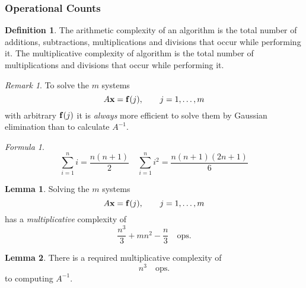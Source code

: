 \documentclass[11pt,letterpaper]{article}
\numberwithin{figure}{section} %
\newcommand{\inv}[1]{#1^{-1}}
\newcommand{\ops}{\quad\text{ops.}}
\newcommand{\keyword}[1]{\colorbox{cyan!20!}{#1}}
\theoremstyle{definition}
\theoremstyle{definition}
\newtheorem{lemma}{Lemma}[subsection]
\theoremstyle{definition}
\newtheorem{definition}{Definition}[subsection]
\theoremstyle{definition}
\theoremstyle{remark}
\newtheorem*{remark}{Remark}
\theoremstyle{remark}
\theoremstyle{definition}
\theoremstyle{remark}
\newtheorem*{formula}{Formula}
\theoremstyle{remark}
\begin{document}
\begin{multicols*}{3}
\subsubsection{Operational Counts}
\begin{definition}
The \keyword{arithmetic complexity} of an algorithm is the total number of
additions, subtractions, multiplications and divisions that occur while
performing it. The \keyword{multiplicative complexity} of algorithm is the
total number of multiplications and divisions that occur while performing it.
\end{definition}
\begin{remark}
To solve the $m$ systems
\[
	A\vb{x} = \vb{f}(j), \qquad j = 1,\ldots, m
\]
with arbitrary $\vb{f}(j)$ it is \emph{always} more efficient to solve them
by Gaussian elimination than to calculate $\inv{A}$.
\end{remark}
\begin{formula}
	\[
		\sum_{i=1}^n i = \frac{n(n+1)}{2} \quad \sum_{i=1}^n i^2 =
		\frac{n(n+1)(2n+1)}{6}
	\]
\end{formula}
\begin{lemma}
	Solving the $m$ systems
\[
	A\vb{x} = \vb{f}(j), \qquad j = 1,\ldots, m
\]
has a \emph{multiplicative} complexity of 
\[
	\frac{n^3}{3} + mn^2 - \frac{n}{3} \ops
\]
\end{lemma}
\begin{lemma}
	There is a required multiplicative complexity of
	\[
		n^3 \ops
	\]
	to computing $\inv{A}$.
\end{lemma}

\end{multicols*}
\end{document}
